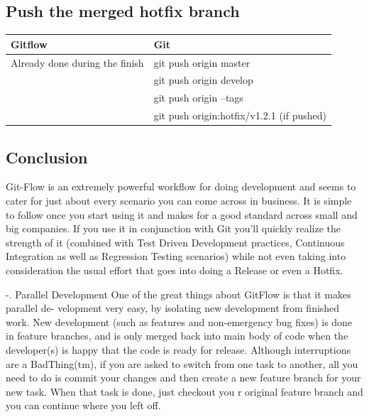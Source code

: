 \documentclass{tufte-handout}
\begin{document}
		\subsection{Push the merged hotfix branch}
		
		\begin{table}[ht]
			\centering
			\selectfont
			\begin{tabular}{ll}
				\toprule
				Gitflow & Git \\
				\midrule
				Already done during the finish & git push origin master \\
				& git push origin develop \\
				& git push origin --tags \\
				& git push origin:hotfix/v1.2.1 (if pushed) \\
				\bottomrule
			\end{tabular}
			\label{tab:normaltab}
		\end{table}
		\medskip %
		
		\clearpage
		
		\subsection{Conclusion}
		
		\setcounter{alphapara}{0} %
		\newcommand{\alphaparagraph}{%
			\stepcounter{alphapara} %
			\noindent-\alph{alphapara}.\quad\quad %
		}
		
		Git-Flow is an extremely powerful workflow for doing development and
		seems to cater for just about every scenario you can come across in
		business. It is simple to follow once you start using it and makes for a
		good standard across small and big companies. If you use it in
		conjunction with Git you'll quickly realize the strength of it (combined
		with Test Driven Development practices, Continuous Integration as well
		as Regression Testing scenarios) while not even taking into
		consideration the usual effort that goes into doing a Release or even a
		Hotfix.
		\medskip
		
		\alphaparagraph Parallel Development One of the great things about GitFlow is that it makes parallel de- velopment very easy, by isolating new development from finished work. New development (such as features and non-emergency bug fixes) is done in feature branches, and is only merged back into main body of code when the developer(s) is happy that the code is ready for release. Although interruptions are a BadThing(tm), if you are asked to switch from one task to another, all you need to do is commit your changes and then create a new feature branch for your new task. When that task is done, just checkout you r original feature branch and you can continue where you left off.
		\medskip
		
\end{document}
